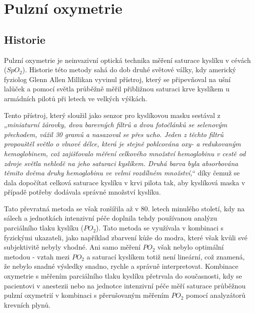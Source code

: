 \section {Pulzní oxymetrie}
\subsection {Historie}
Pulzní oxymetrie je neinvazivní optická technika měření saturace kyslíku v cévách ($SpO_2$). Historie této metody sahá do dob druhé světové války, kdy americký fyziolog Glenn Allen Millikan vyvinul přístroj, který se připevňoval na ušní lalůček a pomocí světla průběžně měřil přibližnou saturaci krve kyslíkem u armádních pilotů při letech ve velkých výškách. {\citep{TremperPulseOximetry}}
\par Tento přístroj, který sloužil jako senzor pro kyslíkovou masku sestával z „\emph{miniaturní žárovky, dvou barevných filtrů a dvou fotočlánků se selenovým přechodem, vážil 30 gramů a nasazoval se přes ucho. Jeden z těchto filtrů propouštěl světlo o vlnové délce, která je stejně pohlcována oxy- a redukovaným hemoglobinem, což zajišťovalo měření celkového množství hemoglobinu v cestě od zdroje světla nehledě na jeho saturaci kyslíkem.  Druhá barva byla absorbována těmito dvěma druhy hemoglobinu ve velmi rozdílném množství,}“ díky čemuž se dala dopočítat celková saturace kyslíku v krvi pilota tak, aby kyslíková maska v případě potřeby dodávala správné množství kyslíku. \citep{1942oximeter}
\par Tato převratná metoda se však rozšířila až v 80. letech minulého století, kdy na sálech a jednotkách intenzivní péče doplnila tehdy používanou analýzu parciálního tlaku kyslíku ($PO_2$). Tato metoda se využívala v kombinaci s fyzickými ukazateli, jako například zbarvení kůže do modra, které však kvůli své subjektivitě nebyly vhodné. Ani samo měření $PO_2$ však nebylo optimální metodou - vztah mezi $PO_2$ a saturací kyslíkem totiž není lineární, což znamená, že nebylo snadné výsledky snadno, rychle a správně interpretovat. Kombinace oxymetrie s měřením parciálního tlaku kyslíku přetrvala do současnosti, kdy se pacientovi v anestezii nebo na jednotce intenzivní péče měří saturace průběžnou pulzní oxymetrií v kombinaci s přerušovaným měřením $PO_2$ pomocí analyzátorů krevních plynů. \citep{KYRIACOU}
